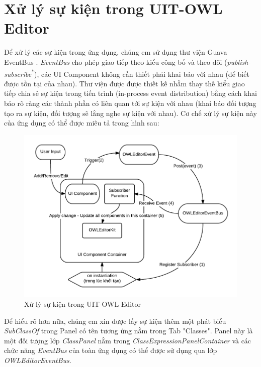 \section{Xử lý sự kiện trong UIT-OWL Editor}
{\let\thefootnote\relax{}
}
Để xử lý các sự kiện trong ứng dụng, chúng em sử dụng thư viện Guava EventBus \cite{guava}. \textit{EventBus} cho phép giao tiếp theo kiểu công bố và theo dõi (\textit{publish-subscribe}\textsuperscript{*}), các UI Component không cần thiết phải khai báo với nhau (để biết được tồn tại của nhau). Thư viện được được thiết kế nhằm thay thế kiểu giao tiếp chia sẻ sự kiện trong tiến trình (in-process event distribution) bằng cách khai báo rõ ràng các thành phần có liên quan tới sự kiện với nhau (khai báo đối tượng tạo ra sự kiện, đối tượng sẽ lắng nghe sự kiện với nhau). Cơ chế xử lý sự kiện này của ứng dụng có thể được miêu tả trong hình sau:
\begin{figure}[h!]
	\centering
	\includegraphics[width=145mm]{Figures/owleditor_eventBus.png}
	\caption{Xử lý sự kiện trong UIT-OWL Editor\label{overflow}}
\end{figure}
Để hiểu rõ hơn nữa, chúng em xin được lấy sự kiện thêm một phát biểu \textit{SubClassOf} trong Panel có tên tương ứng nằm trong Tab "Classes". Panel này là một đối tượng lớp \textit{ClassPanel} nằm trong \textit{ClassExpressionPanelContainer} và các chức năng \textit{EventBus} của toàn ứng dụng có thể được sử dụng qua lớp \textit{OWLEditorEventBus}. 
